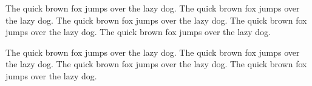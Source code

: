 
\begin{enabstract}

The quick brown fox jumps over the lazy dog. The quick brown fox jumps over the lazy dog. The quick brown fox jumps over the lazy dog. The quick brown fox jumps over the lazy dog. The quick brown fox jumps over the lazy dog.


The quick brown fox jumps over the lazy dog. The quick brown fox jumps over the lazy dog. The quick brown fox jumps over the lazy dog. The quick brown fox jumps over the lazy dog. 


\end{enabstract}